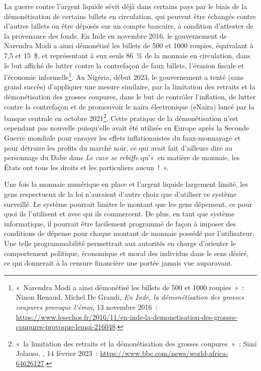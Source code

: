 La guerre contre l'argent liquide sévit déjà dans certains pays par le biais de la démonétisation de certains billets en circulation, qui peuvent être échangés contre d'autres billets ou être déposés sur un compte bancaire, à condition d'attester de la provenance des fonds. En Inde en novembre 2016, le gouvernement de Narendra Modi a ainsi démonétisé les billets de 500 et 1000 roupies, équivalant à 7,5 et 15~\$, et représentant à eux seuls 86~\% de la monnaie en circulation, dans le but affiché de lutter contre la contrefaçon de faux billets, l'évasion fiscale et l'économie informelle\footnote{«~Narendra Modi a ainsi démonétisé les billets de 500 et 1000 roupies~»~: Ninon Renaud, Michel De Grandi, \emph{En Inde, la démonétisation des grosses coupures provoque l'émoi}, 13 novembre 2016~: \url{https://www.lesechos.fr/2016/11/en-inde-la-demonetisation-des-grosses-coupures-provoque-lemoi-216048}.}. Au Nigéria, début 2023, le gouvernement a tenté (sans grand succès) d'appliquer une mesure similaire, par la limitation des retraits et la démonétisation des grosses coupures, dans le but de contrôler l'inflation, de lutter contre la contrefaçon et de promouvoir le naïra électronique (eNaira) lancé par la banque centrale en octobre 2021\footnote{«~la limitation des retraits et la démonétisation des grosses coupures~»~: Simi Jolaoso, , 14 février 2023~: \url{https://www.bbc.com/news/world-africa-64626127}.}. Cette pratique de la démonétisation n'est cependant pas nouvelle puisqu'elle avait été utilisée en Europe après la Seconde Guerre mondiale pour enrayer les effets inflationnistes du faux-monnayage et pour détruire les profits du marché noir, ce qui avait fait d'ailleurs dire au personnage du Dabe dans \emph{Le cave se rebiffe} qu'«~en matière de monnaie, les États ont tous les droits et les particuliers aucun~!~».


Une fois la monnaie numérique en place et l'argent liquide largement limité, les gens respectueux de la loi n'auraient d'autre choix que d'utiliser ce système surveillé. Le système pourrait limiter le montant que les gens dépensent, ce pour quoi ils l'utilisent et avec qui ils commercent. De plus, en tant que système informatique, il pourrait être facilement programmé de façon à imposer des conditions de dépense pour chaque montant de monnaie possédé par l'utilisateur. Une telle programmabilité permettrait aux autorités en charge d'orienter le comportement politique, économique et moral des individus dans le sens désiré, ce qui donnerait à la censure financière une portée jamais vue auparavant.

